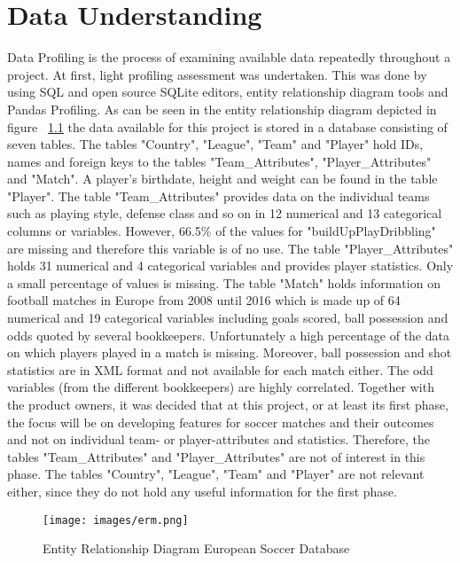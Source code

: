 
\chapter{Data Understanding}
\label{chap:data_understanding}

Data Profiling is the process of examining available data repeatedly throughout a project. At first, light profiling assessment was undertaken. This was done by using SQL and open source SQLite editors, entity relationship diagram tools and Pandas Profiling. As can be seen in the entity relationship diagram depicted in figure ~\ref{fig:erm} the data available for this project is stored in a database consisting of seven tables.
\newline
The tables "Country", "League", "Team" and "Player" hold IDs, names and foreign keys to the tables "Team\_Attributes", "Player\_Attributes" and "Match". A player's birthdate, height and weight can be found in the table "Player".
\newline
The table "Team\_Attributes" provides data on the individual teams such as playing style, defense class and so on in 12 numerical and 13 categorical columns or variables. However, 66.5\% of the values for "buildUpPlayDribbling" are missing and therefore this variable is of no use.
\newline
The table "Player\_Attributes" holds 31 numerical and 4 categorical variables and provides player statistics. Only a small percentage of values is missing.
\newline
The table "Match" holds information on football matches in Europe from 2008 until 2016 which is made up of 64 numerical and 19 categorical variables including goals scored, ball possession and odds quoted by several bookkeepers. Unfortunately a high percentage of the data on which players played in a match is missing. Moreover, ball possession and shot statistics are in XML format and not available for each match either. The odd variables (from the different bookkeepers) are highly correlated.   
\newline
Together with the product owners, it was decided that at this project, or at least its first phase, the focus will be on developing features for soccer matches and their outcomes and not on individual team- or player-attributes and statistics. Therefore, the tables "Team\_Attributes" and "Player\_Attributes" are not of interest in this phase. The tables "Country", "League", "Team" and "Player" are not relevant either, since they do not hold any useful information for the first phase.


\begin{figure}[H]
\centering
\texttt{[image: images/erm.png]}
\caption{Entity Relationship Diagram European Soccer Database}
\label{fig:erm}
\end{figure}